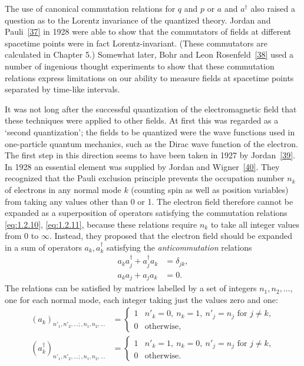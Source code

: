 The use of canonical commutation relations for $q$ and $p$ or $a$ and
$a^{\dagger}$ also raised a question as to the Lorentz invariance of the
quantized theory. Jordan and Pauli~\hyperref[ref:1.37]{[37]} in 1928 were able to show that the
commutators of fields at different spacetime points were in fact
Lorentz-invariant. (These commutators are calculated in Chapter 5.) Somewhat
later, Bohr and Leon Rosenfeld~\hyperref[ref:1.38]{[38]} used a number of ingenious thought
experiments to show that these commutation relations express limitations on
our ability to measure fields at spacetime points separated by time-like
intervals.

It was not long after the successful quantization of the electromagnetic
field that these techniques were applied to other fields. At first this was
regarded as a `second quantization'; the fields to be quantized were the wave
functions used in one-particle quantum mechanics, such as the Dirac wave
function of the electron. The first step in this direction seems to have been
taken in 1927 by Jordan~\hyperref[ref:1.39]{[39]}. In 1928 an essential element was supplied by
Jordan and Wigner~\hyperref[ref:1.40]{[40]}. They recognized that the Pauli exclusion principle
prevents the occupation number $n_k$ of electrons in any normal mode $k$
(counting spin as well as position variables) from taking any values other
than 0 or 1. The electron field therefore cannot be expanded as a
superposition of operators satisfying the commutation relations \eqref{eq:1.2.10},
\eqref{eq:1.2.11}, because these relations require $n_k$ to take all integer values
from 0 to $\infty$. Instead, they proposed that the electron field should be
expanded in a sum of operators $a_k,a_k^{\dagger}$ satisfying the
\emph{anticommutation} relations
\begin{align}
  a_ka_j^{\dagger}+a_j^{\dagger}a_k&=\delta_{jk},
  \tag{1.2.22}\label{eq:1.2.22}\\
  a_ka_j+a_ja_k&=0.
  \tag{1.2.23}\label{eq:1.2.23}
\end{align}
The relations can be satisfied by matrices labelled by a set of integers
$n_1,n_2,\ldots$, one for each normal mode, each integer taking just the values
zero and one:
\begin{align}
  (a_k)_{n'_1,n'_2,\ldots;,n_1,n_2,\ldots}
  &=\begin{cases}
    1&n'_k=0,\ n_k=1,\ n'_j=n_j\text{ for }j\ne k,\\
    0&\text{otherwise},
  \end{cases}
  \tag{1.2.24}\label{eq:1.2.24}\\
  (a_k^{\dagger})_{n'_1,n'_2,\ldots;,n_1,n_2,\ldots}
  &=\begin{cases}
    1&n'_k=1,\ n_k=0,\ n'_j=n_j\text{ for }j\ne k,\\
    0&\text{otherwise}.
  \end{cases}
  \tag{1.2.25}\label{eq:1.2.25}
\end{align}
